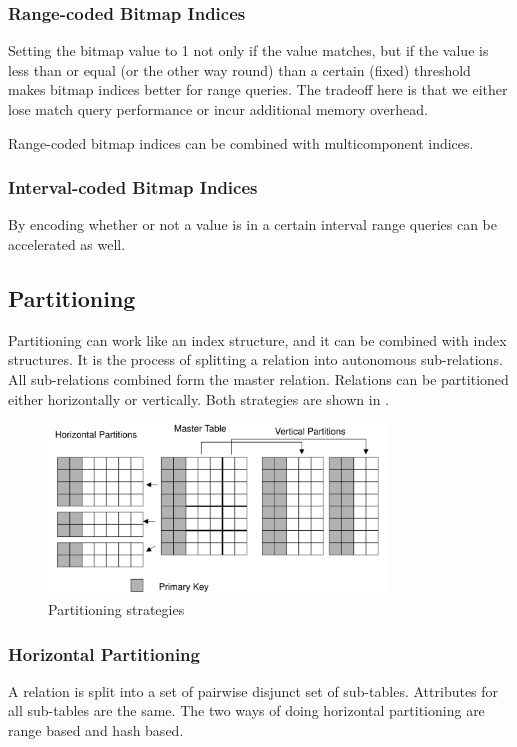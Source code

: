 \documentclass{article}
\begin{document}
\subsubsection{Range-coded Bitmap Indices}
Setting the bitmap value to 1 not only if the value matches, but if the value is less than or equal (or the other way round) than a certain (fixed) threshold makes bitmap indices better for range queries.
The tradeoff here is that we either lose match query performance or incur additional memory overhead.

Range-coded bitmap indices can be combined with multicomponent indices.

\subsubsection{Interval-coded Bitmap Indices}
By encoding whether or not a value is in a certain interval range queries can be accelerated as well.

\subsection{Partitioning}
Partitioning can work like an index structure, and it can be combined with index structures.
It is the process of splitting a relation into autonomous sub-relations.
All sub-relations combined form the master relation.
Relations can be partitioned either horizontally or vertically.
Both strategies are shown in .

\begin{figure}[hp]
    \centering
    \includegraphics[width=0.8\textwidth]{partition.png}
    \caption{Partitioning strategies}
    \label{fig:partitioning}
\end{figure}

\subsubsection{Horizontal Partitioning}
A relation is split into a set of pairwise disjunct set of sub-tables.
Attributes for all sub-tables are the same.
The two ways of doing horizontal partitioning are range based and hash based.
\end{document}
